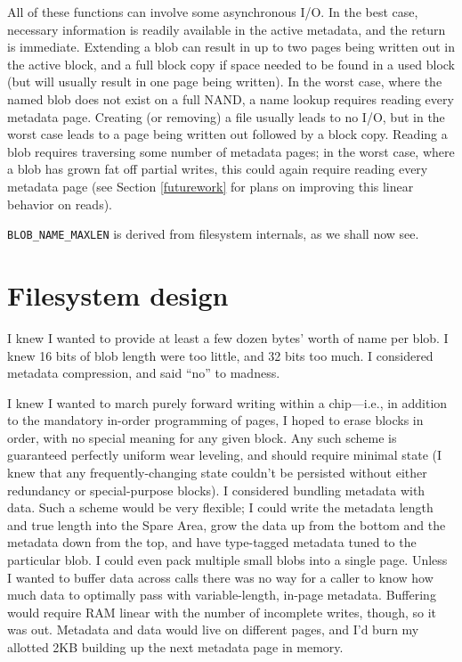 \documentclass[letterpaper,10pt]{article}
\begin{document}
All of these functions can involve some asynchronous I/O. In the best case,
necessary information is readily available in the active metadata, and the
return is immediate. Extending a blob can result in up to two pages being
written out in the active block, and a full block copy if space needed to be
found in a used block (but will usually result in one page being written).
In the worst case, where the named blob does not exist on a full NAND, a name
lookup requires reading every metadata page. Creating (or removing) a file
usually leads to no I/O, but in the worst case leads to a page being written
out followed by a block copy. Reading a blob requires traversing some number of
metadata pages; in the worst case, where a blob has grown fat off partial
writes, this could again require reading every metadata page (see
Section \ref{futurework} for plans on improving this linear behavior on reads).

\texttt{BLOB\_NAME\_MAXLEN} is derived from filesystem internals, as we shall
now see.

\section{Filesystem design}

I knew I wanted to provide at least a few dozen bytes' worth of name per blob.
I knew 16 bits of blob length were too little, and 32 bits too much.
I considered metadata compression, and said ``no'' to madness.

I knew I wanted to march purely forward writing within a chip---i.e., in
addition to the mandatory in-order programming of pages, I hoped to erase
blocks in order, with no special meaning for any given block. Any such scheme
is guaranteed perfectly uniform wear leveling, and should require minimal state
(I knew that any frequently-changing state couldn't be persisted without either
redundancy or special-purpose blocks). I considered bundling metadata with
data. Such a scheme would be very flexible; I could write the metadata length
and true length into the Spare Area, grow the data up from the bottom and the
metadata down from the top, and have type-tagged metadata tuned to the particular
blob. I could even pack multiple small blobs into a single page. Unless I
wanted to buffer data across calls there was no way for a caller to know how
much data to optimally pass with variable-length, in-page metadata. Buffering
would require RAM linear with the number of incomplete writes, though, so it
was out. Metadata and data would live on different pages, and I'd burn my
allotted 2KB building up the next metadata page in memory.
\end{document}
